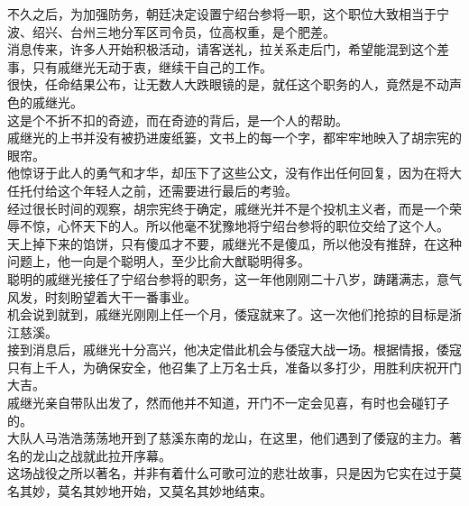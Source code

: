 \begin{multicols}{\theparacolNo}
不久之后，为加强防务，朝廷决定设置宁绍台参将一职，这个职位大致相当于宁波、绍兴、台州三地分军区司令员，位高权重，是个肥差。\\

消息传来，许多人开始积极活动，请客送礼，拉关系走后门，希望能混到这个差事，只有戚继光无动于衷，继续干自己的工作。\\

很快，任命结果公布，让无数人大跌眼镜的是，就任这个职务的人，竟然是不动声色的戚继光。\\

这是个不折不扣的奇迹，而在奇迹的背后，是一个人的帮助。\\

戚继光的上书并没有被扔进废纸篓，文书上的每一个字，都牢牢地映入了胡宗宪的眼帘。\\

他惊讶于此人的勇气和才华，却压下了这些公文，没有作出任何回复，因为在将大任托付给这个年轻人之前，还需要进行最后的考验。\\

经过很长时间的观察，胡宗宪终于确定，戚继光并不是个投机主义者，而是一个荣辱不惊，心怀天下的人。所以他毫不犹豫地将宁绍台参将的职位交给了这个人。\\

天上掉下来的馅饼，只有傻瓜才不要，戚继光不是傻瓜，所以他没有推辞，在这种问题上，他一向是个聪明人，至少比俞大猷聪明得多。\\

聪明的戚继光接任了宁绍台参将的职务，这一年他刚刚二十八岁，踌躇满志，意气风发，时刻盼望着大干一番事业。\\

机会说到就到，戚继光刚刚上任一个月，倭寇就来了。这一次他们抢掠的目标是浙江慈溪。\\

接到消息后，戚继光十分高兴，他决定借此机会与倭寇大战一场。根据情报，倭寇只有上千人，为确保安全，他召集了上万名士兵，准备以多打少，用胜利庆祝开门大吉。\\

戚继光亲自带队出发了，然而他并不知道，开门不一定会见喜，有时也会碰钉子的。\\

大队人马浩浩荡荡地开到了慈溪东南的龙山，在这里，他们遇到了倭寇的主力。著名的龙山之战就此拉开序幕。\\

这场战役之所以著名，并非有着什么可歌可泣的悲壮故事，只是因为它实在过于莫名其妙，莫名其妙地开始，又莫名其妙地结束。\\


\end{multicols}
